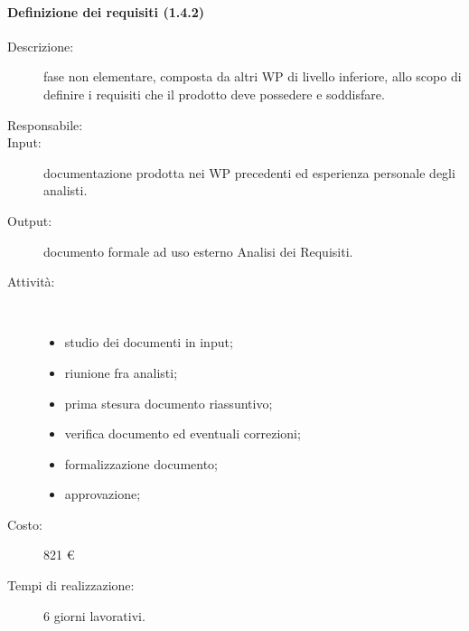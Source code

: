 \paragraph{Definizione dei requisiti (1.4.2)}
\begin{description}
\item[Descrizione:] fase non elementare, composta da altri WP di livello inferiore, allo scopo di definire i requisiti che il prodotto deve possedere e soddisfare.
\item[Responsabile:] 
\item[Input:] documentazione prodotta nei WP precedenti ed esperienza personale degli analisti.
\item[Output:] documento formale ad uso esterno Analisi dei Requisiti.
\item[Attività:]\mbox{}\\[-1.5\baselineskip]
	\begin{itemize}
	\item studio dei documenti in input;
	\item riunione fra analisti;
	\item prima stesura documento riassuntivo;
	\item verifica documento ed eventuali correzioni;
	\item formalizzazione documento;
	\item approvazione;
	\end{itemize}
\item[Costo:] 821 \euro{}
\item[Tempi di realizzazione:] 6 giorni lavorativi.
\end{description}

